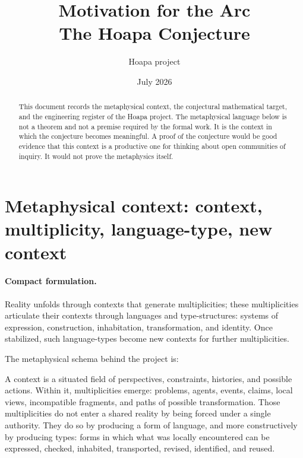 \documentclass[11pt]{article}
\title{Motivation for the Arc\\[0.35em]\large The Hoapa Conjecture}
\author{Hoapa project}
\date{July 2026}
\begin{document}
\maketitle

\begin{abstract}
This document records the metaphysical context, the conjectural mathematical
target, and the engineering register of the Hoapa project. The metaphysical
language below is not a theorem and not a premise required by the formal work.
It is the context in which the conjecture becomes meaningful. A proof of the
conjecture would be good evidence that this context is a productive one for
thinking about open communities of inquiry. It would not prove the metaphysics
itself.
\end{abstract}

\tableofcontents
\newpage

\section{Metaphysical context: context, multiplicity, language-type, new context}

\paragraph{Compact formulation.}
Reality unfolds through contexts that generate multiplicities; these
multiplicities articulate their contexts through languages and type-structures:
systems of expression, construction, inhabitation, transformation, and
identity. Once stabilized, such language-types become new contexts for further
multiplicities.

The metaphysical schema behind the project is:

\begin{center}
\end{center}

A context is a situated field of perspectives, constraints, histories, and
possible actions. Within it, multiplicities emerge: problems, agents, events,
claims, local views, incompatible fragments, and paths of possible
transformation. Those multiplicities do not enter a shared reality by being
forced under a single authority. They do so by producing a form of language,
and more constructively by producing types: forms in which what was locally
encountered can be expressed, checked, inhabited, transported, revised,
identified, and reused.
\end{document}
